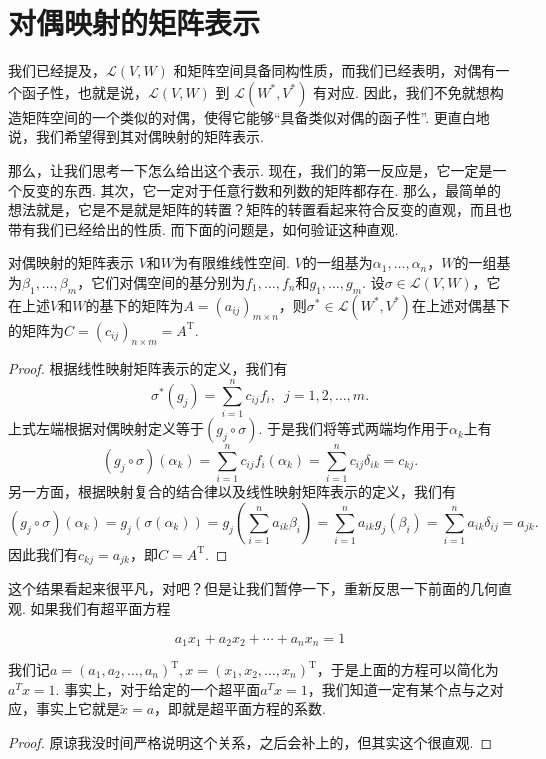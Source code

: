 \section{对偶映射的矩阵表示}

我们已经提及，$\mathcal{L}(V, W)$ 和矩阵空间具备同构性质，而我们已经表明，对偶有一个函子性，也就是说，$\mathcal{L}(V, W)$ 到 $\mathcal{L}(W^*, V^*)$ 有对应. 因此，我们不免就想构造矩阵空间的一个类似的对偶，使得它能够``具备类似对偶的函子性''. 更直白地说，我们希望得到其对偶映射的矩阵表示.

那么，让我们思考一下怎么给出这个表示. 现在，我们的第一反应是，它一定是一个反变的东西. 其次，它一定对于任意行数和列数的矩阵都存在. 那么，最简单的想法就是，它是不是就是矩阵的转置？矩阵的转置看起来符合反变的直观，而且也带有我们已经给出的性质. 而下面的问题是，如何验证这种直观.
\begin{theorem}{}{对偶映射的矩阵表示}
    $V$和$W$为有限维线性空间. $V$的一组基为$\alpha_1,\ldots,\alpha_n$，$W$的一组基为$\beta_1,\ldots,\beta_m$，它们对偶空间的基分别为$f_1,\ldots,f_n$和$g_1,\ldots,g_m$. 设$\sigma\in\mathcal{L}(V,W)$，它在上述$V$和$W$的基下的矩阵为$A=(a_{ij})_{m \times n}$，则$\sigma^*\in\mathcal{L}(W^*,V^*)$在上述对偶基下的矩阵为$C=(c_{ij})_{n \times m}=A^\mathrm{T}$.
\end{theorem}

\begin{proof}
    根据线性映射矩阵表示的定义，我们有
    \[\sigma^*(g_j)=\sum_{i=1}^nc_{ij}f_i,\enspace j=1,2,\ldots,m.\]
    上式左端根据对偶映射定义等于$(g_j\circ\sigma)$. 于是我们将等式两端均作用于$\alpha_k$上有
    \[(g_j\circ\sigma)(\alpha_k)=\sum_{i=1}^nc_{ij}f_i(\alpha_k)=\sum_{i=1}^nc_{ij}\delta_{ik}=c_{kj}.\]
    另一方面，根据映射复合的结合律以及线性映射矩阵表示的定义，我们有
    \[(g_j\circ\sigma)(\alpha_k)=g_j(\sigma(\alpha_k))=g_j\left(\sum_{i=1}^na_{ik}\beta_i\right)=\sum_{i=1}^na_{ik}g_j(\beta_i)=\sum_{i=1}^na_{ik}\delta_{ij}=a_{jk}.\]
    因此我们有$c_{kj}=a_{jk}$，即$C=A^\mathrm{T}$.
\end{proof}

这个结果看起来很平凡，对吧？但是让我们暂停一下，重新反思一下前面的几何直观. 如果我们有超平面方程

\[
    a_1 x_1 + a_2 x_2 + \cdots + a_n x_n = 1
\]

我们记$a=(a_1,a_2,\ldots,a_n)^\mathrm{T},x=(x_1,x_2,\ldots,x_n)^\mathrm{T}$，于是上面的方程可以简化为$a^T x = 1$. 事实上，对于给定的一个超平面$a^T x = 1$，我们知道一定有某个点与之对应，事实上它就是$\tilde{x} = a$，即就是超平面方程的系数.
\begin{proof}
    原谅我没时间严格说明这个关系，之后会补上的，但其实这个很直观.
\end{proof}

